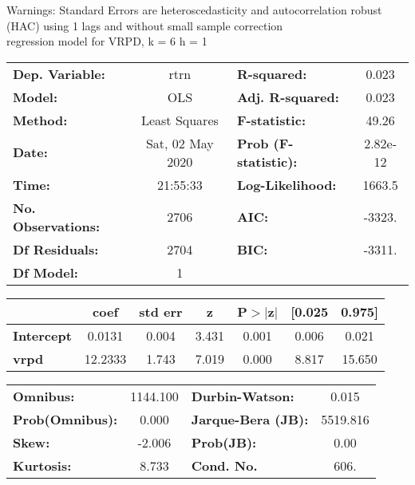 Warnings: \newline
 [1] Standard Errors are heteroscedasticity and autocorrelation robust (HAC) using 1 lags and without small sample correction\\ 

regression model for VRPD, k = 6 h = 1\begin{center}
\begin{tabular}{lclc}
\toprule
\textbf{Dep. Variable:}    &       rtrn       & \textbf{  R-squared:         } &     0.023   \\
\textbf{Model:}            &       OLS        & \textbf{  Adj. R-squared:    } &     0.023   \\
\textbf{Method:}           &  Least Squares   & \textbf{  F-statistic:       } &     49.26   \\
\textbf{Date:}             & Sat, 02 May 2020 & \textbf{  Prob (F-statistic):} &  2.82e-12   \\
\textbf{Time:}             &     21:55:33     & \textbf{  Log-Likelihood:    } &    1663.5   \\
\textbf{No. Observations:} &        2706      & \textbf{  AIC:               } &    -3323.   \\
\textbf{Df Residuals:}     &        2704      & \textbf{  BIC:               } &    -3311.   \\
\textbf{Df Model:}         &           1      & \textbf{                     } &             \\
\bottomrule
\end{tabular}
\begin{tabular}{lcccccc}
                   & \textbf{coef} & \textbf{std err} & \textbf{z} & \textbf{P$> |$z$|$} & \textbf{[0.025} & \textbf{0.975]}  \\
\midrule
\textbf{Intercept} &       0.0131  &        0.004     &     3.431  &         0.001        &        0.006    &        0.021     \\
\textbf{vrpd}      &      12.2333  &        1.743     &     7.019  &         0.000        &        8.817    &       15.650     \\
\bottomrule
\end{tabular}
\begin{tabular}{lclc}
\textbf{Omnibus:}       & 1144.100 & \textbf{  Durbin-Watson:     } &    0.015  \\
\textbf{Prob(Omnibus):} &   0.000  & \textbf{  Jarque-Bera (JB):  } & 5519.816  \\
\textbf{Skew:}          &  -2.006  & \textbf{  Prob(JB):          } &     0.00  \\
\textbf{Kurtosis:}      &   8.733  & \textbf{  Cond. No.          } &     606.  \\
\bottomrule
\end{tabular}
\end{center}

